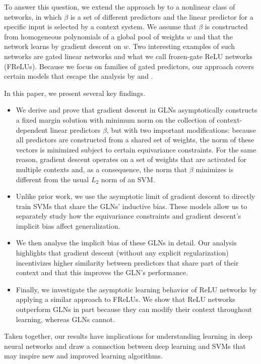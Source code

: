 \documentclass{article}
\theoremstyle{plain}
\theoremstyle{definition}
\theoremstyle{remark}
\begin{document}
To answer this question, we extend the approach by \citet{gunasekar_implicit_2018} to a nonlinear class of networks, in which $\beta$ is a set of different predictors and the linear predictor for a specific input is selected by a context system.
We assume that $\beta$ is constructed from homogeneous polynomials of a global pool of weights $w$ and that the network learns by gradient descent on $w$.
Two interesting examples of such networks are gated linear networks \citep[GLNs;][]{veness_online_2017} and what we call frozen-gate ReLU networks (FReLUs).
Because we focus on families of gated predictors, our approach covers certain models that escape the analysis by \citet{nacson_lexicographic_2019} and \citet{lyu_gradient_2020}.

In this paper, we present several key findings.
\begin{itemize}
    \item We derive and prove that gradient descent in GLNs asymptotically constructs a fixed margin solution with minimum norm on the collection of context-dependent linear predictors $\beta$, but with two important modifications: because all predictors are constructed from a shared set of weights, the norm of these vectors is minimized subject to certain equivariance constraints. For the same reason, gradient descent operates on a set of weights that are activated for multiple contexts and, as a consequence, the norm that $\beta$ minimizes is different from the usual $L_2$ norm of an SVM.
    \item Unlike prior work, we use the asymptotic limit of gradient descent to directly train SVMs that share the GLNs' inductive bias. These models allow us to separately study how the equivariance constraints and gradient descent's implicit bias affect generalization.
    \item We then analyse the implicit bias of these GLNs in detail. Our analysis highlights that gradient descent (without any explicit regularization) incentivizes higher similarity between predictors that share part of their context and that this improves the GLN's performance.
    \item Finally, we investigate the asymptotic learning behavior of ReLU networks by applying a similar approach to FReLUs. We show that ReLU networks outperform GLNs in part because they can modify their context throughout learning, whereas GLNs cannot.
\end{itemize}

Taken together, our results have implications for understanding learning in deep neural networks and draw a connection between deep learning and SVMs that may inspire new and improved learning algorithms.
\end{document}
